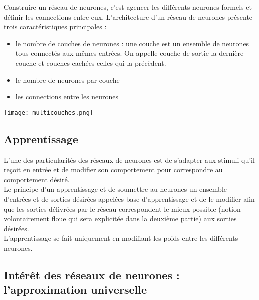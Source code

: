 \documentclass[a4paper, 11pt]{article}
\begin{document}
Construire un réseau de neurones, c'est agencer les différents neurones formels et définir les connections entre eux. L'architecture d'un réseau de neurones présente trois caractéristiques principales : 
\begin{itemize}
\item le nombre de couches de neurones : une couche est un ensemble de neurones tous connectés aux mêmes entrées. On appelle couche de sortie la dernière couche et couches cachées celles qui la précèdent.
\item le nombre de neurones par couche 
\item les connections entre les neurones
\end{itemize}
\begin{center}
\texttt{[image: multicouches.png]} \\
\end{center}

\subsection{Apprentissage}

L'une des particularités des réseaux de neurones est de s'adapter aux stimuli qu'il reçoit en entrée et de modifier son comportement pour correspondre au comportement désiré. \\ 
Le principe d'un apprentissage et de soumettre au neurones un ensemble d'entrées et de sorties désirées appelées base d'apprentissage et de le modifier afin que les sorties délivrées par le réseau correspondent le mieux possible (notion volontairement floue qui sera explicitée dans la deuxième partie) aux sorties désirées. \\
L'apprentissage se fait uniquement en modifiant les poids entre les différents neurones. 

\subsection{Intérêt des réseaux de neurones : l'approximation universelle}
\end{document}
